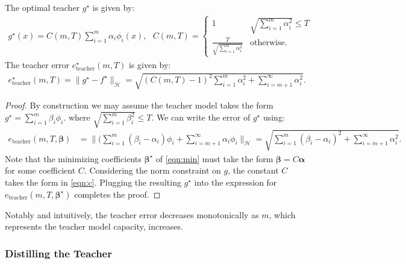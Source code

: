 \begin{lemma}\label{lem:teacher}
	The optimal teacher $g^\star$ is given by:
	\begin{align}\label{eqn:c}
		g^\star(x) = C(m,T)\sum_{i=1}^m\alpha_i \phi_i(x),~~~C(m,T) = \begin{cases}
			                                                              1                                       & \sqrt{\sum_{i=1}^m\alpha_i^2}\leq T \\
			                                                              \frac{T}{\sqrt{\sum_{i=1}^m\alpha_i^2}} & \text{otherwise.}
		                                                              \end{cases}
	\end{align}
	The teacher error $e^\star_\text{teacher}(m,T)$ is given by:
	\begin{align}
		e^\star_\text{teacher}(m,T) = \|g^\star - f^\star\|_\mathcal{H} = \sqrt{(C(m,T) - 1)^2\sum_{i=1}^m\alpha_i^2+ \sum_{i=m+1}^\infty \alpha_i^2}.
	\end{align}
	\begin{proof}
		By construction we may assume the teacher model takes the form $g^\star = \sum_{i=1}^m \beta_i \phi_i$.
		where $\sqrt{\sum_{i=1}^m\beta_i^2} \leq T$. We can write the error of $g^\star$ using:
		\begin{align}
			e_\text{teacher}(m,T, \bm{\beta}) & = \Big\|\big(\sum_{i=1}^m(\beta_i - \alpha_i)\phi_i + \sum_{i=m+1}^\infty \alpha_i\phi_i\Big\|_\mathcal{H}  = \sqrt{\sum_{i=1}^m(\beta_i - \alpha_i)^2 + \sum_{i=m+1}^\infty \alpha_i^2 }.\label{eqn:min}
		\end{align}
		Note that the minimizing coefficients $\bm{\beta}^\star$ of \cref{eqn:min} must take the form $\bm{\beta} = C\bm{\alpha}$ for some coefficient $C$. Considering the norm constraint on $g$, the constant $C$ takes the form in \cref{eqn:c}. Plugging the resulting $g^\star$ into the expression for $e_\text{teacher}(m,T, \bm{\beta}^\star)$ completes the proof.
	\end{proof}
\end{lemma}

Notably and intuitively, the teacher error decreases monotonically as $m$, which represents the teacher model capacity, increases.
\subsubsection{Distilling the Teacher}
\label{sssec:distilling-the-teacher}

